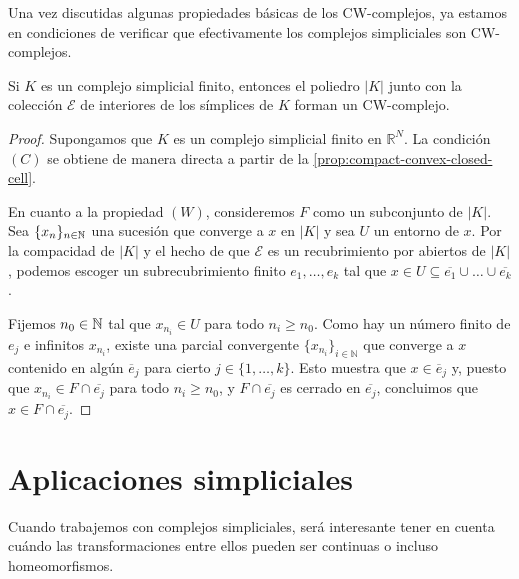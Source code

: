 Una vez discutidas algunas propiedades básicas de los CW-complejos, ya estamos
en condiciones de verificar que efectivamente los complejos simpliciales son CW-complejos.

\begin{proposicion}
	Si $K$ es un complejo simplicial finito, entonces el poliedro $|K|$ junto con
	la colección $\mathcal{E}$ de interiores de los símplices de $K$ forman un CW-complejo.
\end{proposicion}
\begin{proof}
	Supongamos que $K$ es un complejo simplicial finito en $\mathbb{R}^{N}$. La
	condición $(C)$ se obtiene de manera directa a partir de la
	\autoref{prop:compact-convex-closed-cell}.
	
	En cuanto a la propiedad $(W)$, consideremos $F$ como un subconjunto de $|K|$.
	Sea $\{x_{n}\}_{n \in \mathbb{N}}$ una sucesión que converge a $x$ en $|K|$ y sea $U$
	un entorno de $x$. Por la compacidad de $|K|$ y el hecho de que $\mathcal{E}$ es
	un recubrimiento por abiertos de $|K|$, podemos escoger un subrecubrimiento
	finito $e_{1}, \ldots, e_{k}$ tal que
	$x \in U \subseteq \overline{e_1}\cup \ldots \cup \overline{e_k}$.
	
	Fijemos $n_{0}\in \mathbb{N}$ tal que $x_{n_i}\in U$ para todo $n_{i}\geq n_{0}$. Como
	hay un número finito de $e_{j}$ e infinitos $x_{n_i}$, existe una parcial
	convergente $\{x_{n_i}\}_{i \in \mathbb{N}}$ que converge a $x$ contenido en
	algún $\overline{e}_{j}$ para cierto $j \in \{1, \ldots, k\}$. Esto muestra que
	$x \in \overline{e}_{j}$ y, puesto que $x_{n_i}\in F \cap \overline{e_j}$ para
	todo $n_{i}\geq n_{0}$, y $F \cap \overline{e_j}$ es cerrado en $\overline{e_j}$,
	concluimos que $x \in F \cap \overline{e_j}$.
\end{proof}

\section{Aplicaciones simpliciales}

Cuando trabajemos con complejos simpliciales, será interesante tener en cuenta cuándo
las transformaciones entre ellos pueden ser continuas o incluso homeomorfismos.

